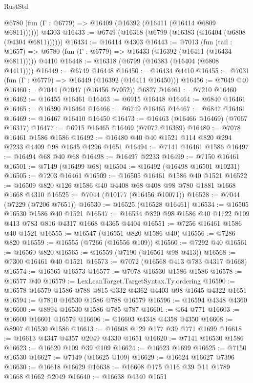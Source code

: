 \begin{lexlean}{RustStd}
\begin{coremodule}
      @6780 (fun (Γ : @6779) => @16409 (@16392 (@16411 (@16414 @6809 @6811))))))
    @4303
@16433 := @6749 (@16318 (@6799 (@16383 (@16404 (@6808 (@4304 @6811))))))
@16434 := @16414 @4303
@16443 := @7013
    (fun (tail : @1657) => @6780 (fun (Γ : @6779) => @16433 (@16392 (@16411 (@16434 @6811)))))
    @4410
@16448 := @16318 (@6799 (@16383 (@16404 (@6808 @4411))))
@16449 := @6749 @16448
@16450 := @16434 @4410
@16455 := @7031 (fun (Γ : @6779) => @16449 (@16392 (@16411 @16450)))
@16456 := @7049 @40
@16460 := @7044 (@7047 (@16456 @7052)) @6827
@16461 := @7210 @16460
@16462 := @16455 @16461
@16463 := @6915 @16448
@16464 := @6840 @16461
@16465 := @16390 @16464
@16466 := @6749 @16465
@16467 := @6847 @16461
@16469 := @16467 @16410 @16450
@16473 := @16463 (@16466 @16469) (@7067 @16317)
@16477 := @6915 @16465 @16469 (@7072 @16389)
@16480 := @7078 @16461 @1586 @1586
@16492 := @16480 @40 @40 @1521 @114 @820 @294 @2233 @4409 @98 @1645 @4296 @1651
@16494 := @7141 @16461 @1586
@16497 := @16494 @68 @40 @68
@16498 := @16497 @2233
@16499 := @7150 @16461
@16501 := @7149 (@16499 @68)
@16504 := @16492 (@16498 @16501 @10231)
@16505 := @7203 @16461
@16509 := @16505 @16461 @1586 @40 @1521
@16522 := @16509 @820 @126 @1586 @40 @4408 @68 @408 @98 @780 @1881 @1668 @1668 @4310
@16525 := @7044 (@10177 (@16456 @10071))
@16528 := @7044 (@7229 (@7206 @7651))
@16530 := @16525 (@16528 @16461)
@16534 := @16505 @16530 @1586 @40 @1521
@16547 := @16534 @820 @98 @1586 @40 @1722 @109 @413 @783 @816 @4317 @1668 @4365 @4404
@16551 := @7256 @16461 @1586 @40 @1521
@16555 := @16547 (@16551 @820 @1586 @40)
@16556 := @7286 @820
@16559 := @16555 (@7266 (@16556 @109))
@16560 := @7292 @40
@16561 := @16560 @820
@16565 := @16559 (@7190 (@16561 @98 @413))
@16568 := @7300 @16461 @40 @1521
@16573 := @7072 (@16568 @413 @783 @4317 @1668)
@16574 := @16565 @16573
@16577 := @7078 @16530 @1586 @1586
@16578 := @16577 @40
@16579 := LexLeanTarget.TargetSyntax.Ty.ordering
@16590 := @16578 @16579 @1586 @788 @815 @332 @4362 @4403 @98 @1645 @4322 @1651
@16594 := @7810 @16530 @1586 @788 @16579
@16596 := @16594 @4348 @4360
@16600 := @8894 @16530 @1586 @785 @787
@16601 := @64 @771
@16603 := @16600 @16601 @16579
@16606 := @16603 @4348 @4358 @4350
@16608 := @8907 @16530 @1586
@16613 := @16608 @129 @177 @39 @771 @1699
@16618 := @16613 @4347 @4357 @2049 @4330 @1651
@16620 := @7141 @16530 @1586
@16623 := @16620 @109 @39 @109
@16624 := @16623 @1699
@16625 := @7150 @16530
@16627 := @7149 (@16625 @109)
@16629 := @16624 @16627 @7396
@16630 := @16618 @16629
@16638 := @16608 @175 @116 @39 @11 @1789 @1668 @1662 @2049
@16640 := @16638 @4340 @1651

\end{coremodule}
\end{lexlean}
